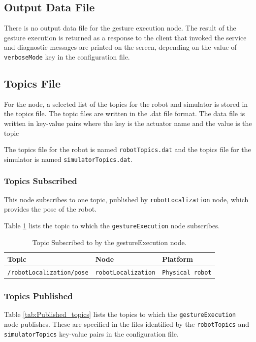 \documentclass{CSSRforAfrica}
\begin{document}
\subsection*{Output Data File}
There is no output data file for the gesture execution node. The result of the gesture execution is returned as a response to the client that invoked the service and diagnostic messages are printed on the screen, depending on the value of \texttt{verboseMode} key in the configuration file.

\subsection*{Topics File}
For the node, a selected list of the topics for the robot and simulator is stored in the topics file. The topic files are written in the .dat file format.
The data file is written in key-value pairs where the key is the actuator name and the value is the topic

The topics file for the robot is named \texttt{robotTopics.dat} and the topics file for the simulator is named \texttt{simulatorTopics.dat}.

\subsubsection*{Topics Subscribed}
This node subscribes to one topic, published by \texttt{robotLocalization} node, which provides the pose
of the robot.

Table \ref{tab:Subscribed_topics} lists the topic to which the \texttt{gestureExecution} node subscribes.
\begin{longtable}[c]{|l|l|l|}
    \caption{Topic Subscribed to by the gestureExecution node.} \label{tab:Subscribed_topics} \\
    \hline
    \rowcolor{gray!30}
    \footnotesize{\textbf{Topic}} & \footnotesize{\textbf{Node}} & \footnotesize{\textbf{Platform}} \\ \hline
    \endhead %
    
    \footnotesize{\texttt{/robotLocalization/pose}} & \footnotesize{\texttt{robotLocalization}} & \footnotesize{\texttt{Physical robot}} \\ \hline
\end{longtable}

\subsubsection*{Topics Published}
Table \ref{tab:Published_topics} lists the topics to which the \texttt{gestureExecution} node publishes. These are specified in the files identified by the \texttt{robotTopics} and \texttt{simulatorTopics} key-value pairs in the configuration file.
\end{document}
